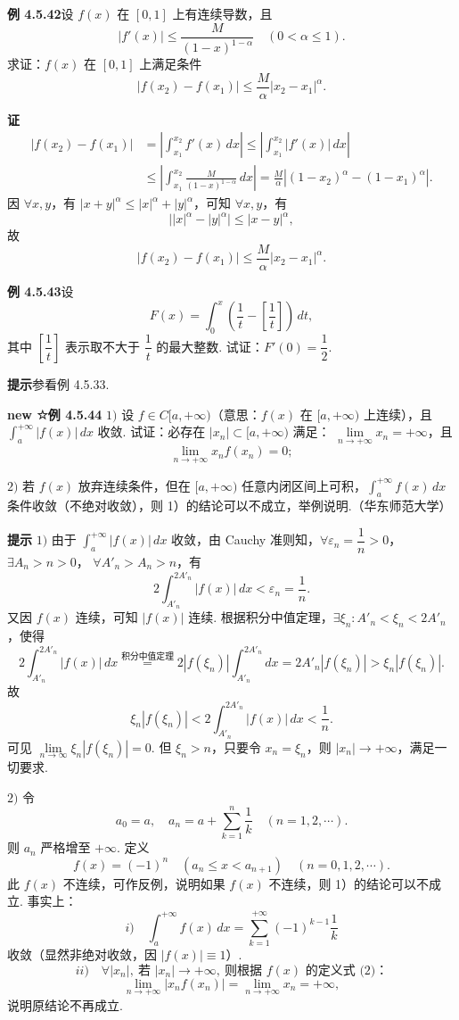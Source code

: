 \documentclass[UTF8, 12pt, fontset=fandol, oneside]{ctexart}
\begin{document}
\noindent\textbf{例 4.5.42}\quad 设 $f(x)$ 在 $[0,1]$ 上有连续导数，且
\[
|f'(x)|\le\frac{M}{(1-x)^{1-\alpha}}\quad(0<\alpha\le1).
\]
求证：$f(x)$ 在 $[0,1]$ 上满足条件
\[
|f(x_2)-f(x_1)|\le\frac M\alpha |x_2-x_1|^\alpha.
\]

\noindent\textbf{证}\quad
\[
\begin{aligned}
|f(x_2)-f(x_1)|
&=\left|\int_{x_1}^{x_2}f'(x)\,dx\right|
\le\left|\int_{x_1}^{x_2}|f'(x)|\,dx\right|\\
&\le\left|\int_{x_1}^{x_2}\frac M{(1-x)^{1-\alpha}}\,dx\right|
=\frac M\alpha\left|(1-x_2)^\alpha-(1-x_1)^\alpha\right|.
\end{aligned}
\]
因 $\forall x,y$，有 $|x+y|^\alpha\le |x|^\alpha+|y|^\alpha$，可知 $\forall x,y$，有
\[
\bigl||x|^\alpha-|y|^\alpha\bigr|\le |x-y|^\alpha,
\]
故
\[
|f(x_2)-f(x_1)|\le\frac M\alpha |x_2-x_1|^\alpha.
\]

\noindent\textbf{例 4.5.43}\quad 设
\[
F(x)=\int_0^x\left(\frac1t-\left[\frac1t\right]\right)\,dt,
\]
其中 $\left[\dfrac1t\right]$ 表示取不大于 $\dfrac1t$ 的最大整数. 试证：$F'(0)=\dfrac12$.

\noindent\textbf{提示}\quad 参看例 4.5.33.

\noindent\textbf{new ☆例 4.5.44}\quad
$1)$ 设 $f\in C[a,+\infty)$（意思：$f(x)$ 在 $[a,+\infty)$ 上连续），且
$\displaystyle\int_a^{+\infty}|f(x)|\,dx$ 收敛. 试证：必存在 $|x_n|\subset[a,+\infty)$ 满足：
$\lim\limits_{n\to+\infty}x_n=+\infty$，且
\[
\lim_{n\to+\infty}x_nf(x_n)=0;
\]

$2)$ 若 $f(x)$ 放弃连续条件，但在 $[a,+\infty)$ 任意内闭区间上可积，$\displaystyle\int_a^{+\infty}f(x)\,dx$ 条件收敛（不绝对收敛），则 1）的结论可以不成立，举例说明.（华东师范大学）

\noindent\textbf{提示}\quad
$1)$ 由于 $\displaystyle\int_a^{+\infty}|f(x)|\,dx$ 收敛，由 Cauchy 准则知，$\forall\varepsilon_n=\dfrac1n>0$，$\exists A_n>n>0$，
$\forall A'_n>A_n>n$，有
\begin{equation}
2\int_{A'_n}^{2A'_n}|f(x)|\,dx<\varepsilon_n=\frac1n. \tag{1}
\end{equation}
又因 $f(x)$ 连续，可知 $|f(x)|$ 连续. 根据积分中值定理，$\exists\xi_n:A'_n<\xi_n<2A'_n$，使得
\[
2\int_{A'_n}^{2A'_n}|f(x)|\,dx
\stackrel{\text{积分中值定理}}{=}2|f(\xi_n)|\int_{A'_n}^{2A'_n}dx
=2A'_n|f(\xi_n)|>\xi_n|f(\xi_n)|.
\]
故
\[
\xi_n|f(\xi_n)|<2\int_{A'_n}^{2A'_n}|f(x)|\,dx<\frac1n.
\]
可见 $\lim\limits_{n\to\infty}\xi_n|f(\xi_n)|=0$. 但 $\xi_n>n$，只要令 $x_n=\xi_n$，则 $|x_n|\to+\infty$，满足一切要求.

$2)$ 令
\[
a_0=a,\quad a_n=a+\sum_{k=1}^n\frac1k\quad(n=1,2,\cdots).
\]
则 $a_n$ 严格增至 $+\infty$. 定义
\begin{equation}
f(x)=(-1)^n\quad(a_n\le x<a_{n+1})\quad(n=0,1,2,\cdots). \tag{2}
\end{equation}
此 $f(x)$ 不连续，可作反例，说明如果 $f(x)$ 不连续，则 1）的结论可以不成立. 事实上：
\[
i)\quad \int_a^{+\infty}f(x)\,dx
=\sum_{k=1}^{+\infty}(-1)^{k-1}\frac1k
\]
收敛（显然非绝对收敛，因 $|f(x)|\equiv1$）.
\[
ii)\quad \forall |x_n|,\ \text{若 }|x_n|\to+\infty,\ \text{则根据 }f(x)\text{ 的定义式 (2)：}
\]
\[
\lim_{n\to+\infty}|x_nf(x_n)|=\lim_{n\to+\infty}x_n=+\infty,
\]
说明原结论不再成立.
\end{document}
